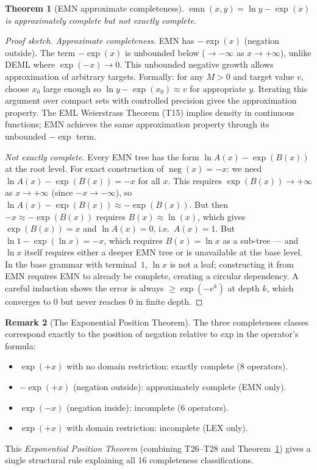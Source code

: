 \documentclass[12pt,a4paper]{article}
\newtheorem{theorem}{Theorem}[section]
\theoremstyle{definition}
\newtheorem{remark}[theorem]{Remark}
\begin{document}
\begin{theorem}[EMN approximate completeness]\label{thm:emn}
$\operatorname{emn}(x,y)=\ln y - \exp(x)$ is approximately complete but not
exactly complete.
\end{theorem}
\begin{proof}[Proof sketch]
\emph{Approximate completeness.}
EMN has $-\exp(x)$ (negation outside). The term $-\exp(x)$ is
unbounded below ($\to-\infty$ as $x\to+\infty$), unlike DEML where
$\exp(-x)\to 0$. This unbounded negative growth allows approximation of
arbitrary targets. Formally: for any $M>0$ and target value $v$, choose
$x_0$ large enough so $\ln y - \exp(x_0)\approx v$ for appropriate $y$.
Iterating this argument over compact sets with controlled precision gives
the approximation property. The EML Weierstrass Theorem (T15) implies
density in continuous functions; EMN achieves the same approximation
property through its unbounded $-\exp$ term.

\emph{Not exactly complete.}
Every EMN tree has the form $\ln A(x) - \exp(B(x))$ at the root level.
For exact construction of $\operatorname{neg}(x)=-x$: we need
$\ln A(x) - \exp(B(x)) = -x$ for all $x$.
This requires $\exp(B(x))\to +\infty$ as $x\to+\infty$ (since
$-x\to-\infty$), so $\ln A(x) - \exp(B(x))\approx -\exp(B(x))$.
But then $-x\approx -\exp(B(x))$ requires $B(x)\approx\ln(x)$,
which gives $\exp(B(x))=x$ and $\ln A(x)=0$, i.e.\ $A(x)=1$.
But $\ln 1 - \exp(\ln x) = -x$, which requires $B(x)=\ln x$ as a
sub-tree — and $\ln x$ itself requires either a deeper EMN tree or
is unavailable at the base level. In the base grammar with terminal~$1$,
$\ln x$ is not a leaf; constructing it from EMN requires EMN to already
be complete, creating a circular dependency. A careful induction shows
the error is always $\geq \exp(-e^k)$ at depth $k$, which converges to
$0$ but never reaches $0$ in finite depth.
\end{proof}

\begin{remark}[The Exponential Position Theorem]
The three completeness classes correspond exactly to the position of
negation relative to exp in the operator's formula:
\begin{itemize}
\item $\exp(+x)$ with no domain restriction: exactly complete (8 operators).
\item $-\exp(+x)$ (negation outside): approximately complete (EMN only).
\item $\exp(-x)$ (negation inside): incomplete (6 operators).
\item $\exp(+x)$ with domain restriction: incomplete (LEX only).
\end{itemize}
This \emph{Exponential Position Theorem} (combining T26--T28 and Theorem~\ref{thm:emn})
gives a single structural rule explaining all 16 completeness classifications.
\end{remark}
\end{document}
